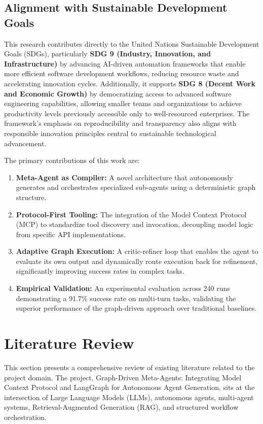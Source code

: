\documentclass[lettersize,journal]{IEEEtran}
\begin{document}
\subsection{Alignment with Sustainable Development Goals}
This research contributes directly to the United Nations Sustainable Development Goals (SDGs), particularly \textbf{SDG 9 (Industry, Innovation, and Infrastructure)} by advancing AI-driven automation frameworks that enable more efficient software development workflows, reducing resource waste and accelerating innovation cycles. Additionally, it supports \textbf{SDG 8 (Decent Work and Economic Growth)} by democratizing access to advanced software engineering capabilities, allowing smaller teams and organizations to achieve productivity levels previously accessible only to well-resourced enterprises. The framework's emphasis on reproducibility and transparency also aligns with responsible innovation principles central to sustainable technological advancement.

The primary contributions of this work are:
\begin{enumerate}
    \item \textbf{Meta-Agent as Compiler:} A novel architecture that autonomously generates and orchestrates specialized sub-agents using a deterministic graph structure.
    \item \textbf{Protocol-First Tooling:} The integration of the Model Context Protocol (MCP) to standardize tool discovery and invocation, decoupling model logic from specific API implementations.
    \item \textbf{Adaptive Graph Execution:} A critic-refiner loop that enables the agent to evaluate its own output and dynamically route execution back for refinement, significantly improving success rates in complex tasks.
    \item \textbf{Empirical Validation:} An experimental evaluation across 240 runs demonstrating a 91.7\% success rate on multi-turn tasks, validating the superior performance of the graph-driven approach over traditional baselines.
\end{enumerate}

\section{Literature Review}

This section presents a comprehensive review of existing literature related to the project domain. The project, Graph-Driven Meta-Agents: Integrating Model Context Protocol and LangGraph for Autonomous Agent Generation, sits at the intersection of Large Language Models (LLMs), autonomous agents, multi-agent systems, Retrieval-Augmented Generation (RAG), and structured workflow orchestration.
\end{document}

